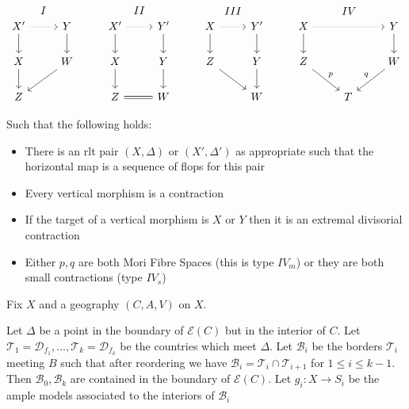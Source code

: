 \documentclass[a4paper,12pt]{amsart}
\begin{document}
\[\begin{tikzcd}
X' \arrow[d] \arrow[r, dotted] \arrow[r, "I", phantom, bend left=49] & Y \arrow[d]  & X' \arrow[r, dotted] \arrow[d] \arrow[r, "II",phantom, bend left=49] & Y' \arrow[d] & X \arrow[r, dotted] \arrow[d] \arrow[r, "III", phantom, bend left=49] & Y' \arrow[d] & X \arrow[d] \arrow[rr, dotted] \arrow[rr, "IV",phantom, bend left] &   & Y \arrow[d]       \\
X \arrow[d]                                                          & W \arrow[ld] & X \arrow[d]                                               & Y \arrow[d]  & Z \arrow[rd]                                              & Y \arrow[d]  & Z \arrow[rd, "p"]                                          &   & W \arrow[ld, "q"'] \\
Z                                                                    &              & Z \arrow[r, equal]                                                         & W            &                                                           & W            &                                                            & T &                  
\end{tikzcd} \]


Such that the following holds:
\begin{itemize}
	\item There is an rlt pair $(X,\Delta)$ or $(X',\Delta')$ as appropriate such that the horizontal map is a sequence of flops for this pair
	\item Every vertical morphism is a contraction
	\item If the target of a vertical morphism is $X$ or $Y$ then it is an extremal divisorial contraction
	\item Either $p,q$ are both Mori Fibre Spaces (this is type $IV_{m}$) or they are both small contractions (type $IV_{s}$)
\end{itemize}



Fix $X$ and a geography $(C,A,V)$ on $X$.

Let $\Delta$ be a point in the boundary of $\mathcal{E}(C)$ but in the interior of $C$. Let $\mathcal{T}_{1}=\mathcal{D}_{f_{1}},..., \mathcal{T}_{k}=\mathcal{D}_{f_{k}}$ be the countries which meet $\Delta$. Let $\mathcal{B}_{i}$ be the borders $\mathcal{T}_{i}$ meeting $B$ such that after reordering we have $\mathcal{B}_{i}=\mathcal{T}_{i}\cap \mathcal{T}_{i+1}$ for $1 \leq i \leq k-1$. Then $\mathcal{B}_{0}, \mathcal{B}_{k}$ are contained in the boundary of $\mathcal{E}(C)$. Let $g_{i}:X \to S_{i}$ be the ample models associated to the interiors of $\mathcal{B}_{i}$
\end{document}
